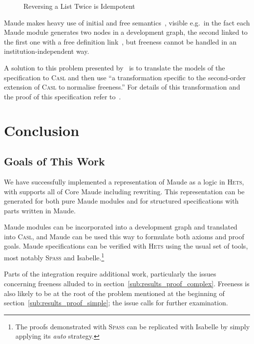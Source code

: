 \documentclass[11pt]{article}
\newcommand{\Casl}{\textsc{Casl}}
\newcommand{\Hets}{\textsc{Hets}}
\newcommand{\Spass}{\textsc{Spass}}
\begin{document}
\begin{figure}[htb]
  
  \caption{Reversing a List Twice is Idempotent}\label{fig:spec-revidem}
\end{figure}

Maude makes heavy use of initial and free semantics~\cite{Codescu:2010}, visible e.g.\ in the fact each Maude module generates two nodes in a development graph, the second linked to the first one with a free definition link~\cite{Mosses:2004}, but freeness cannot be handled in an institution-independent way.

A solution to this problem presented by~\cite{Codescu:2010} is to translate the models of the specification to \Casl{} and then use ``a transformation specific to the second-order extension of \Casl{} to normalise freeness.'' For details of this transformation and the proof of this specification refer to~\cite{Codescu:2010}.


\clearpage
\section{Conclusion} %
\label{sec:conclusion}

\subsection{Goals of This Work}
\label{sub:conclusion_goals}

We have successfully implemented a representation of Maude as a logic in \Hets{}, with supports all of Core Maude including rewriting. This representation can be generated for both pure Maude modules and for structured specifications with parts written in Maude.

Maude modules can be incorporated into a development graph and translated into \Casl{}, and Maude can be used this way to formulate both axioms and proof goals. Maude specifications can be verified with \Hets{} using the usual set of tools, most notably \Spass{} and Isabelle.\footnote{The proofs demonstrated with \Spass{} can be replicated with Isabelle by simply applying its \emph{auto} strategy.}

Parts of the integration require additional work, particularly the issues concerning freeness alluded to in section~\ref{sub:results_proof_complex}. Freeness is also likely to be at the root of the problem mentioned at the beginning of section~\ref{sub:results_proof_simple}; the issue calls for further examination.
\end{document}
